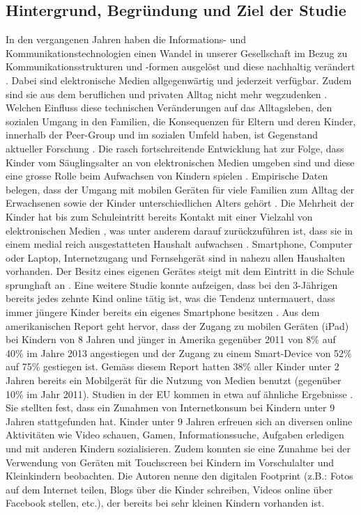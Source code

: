 \subsection{Hintergrund, Begründung und Ziel der Studie} \label{sec:Hintergrund}
In den vergangenen Jahren haben die Informations- und Kommunikationstechnologien einen Wandel in unserer Gesellschaft im Bezug zu Kommunikationsstrukturen und -formen ausgelöst und diese nachhaltig verändert \cite{Hasebrink2009, Bms2013}. Dabei sind elektronische Medien allgegenwärtig und jederzeit verfügbar. Zudem sind sie aus dem beruflichen und privaten Alltag nicht mehr wegzudenken \cite{Bmfsfj2013}. Welchen Einfluss diese technischen Veränderungen auf das Alltagsleben, den sozialen Umgang in den Familien, die Konsequenzen für Eltern und deren Kinder, innerhalb der Peer-Group und im sozialen Umfeld haben, ist Gegenstand aktueller Forschung \cite{Olafsson2014}. Die rasch fortschreitende Entwicklung hat zur Folge, dass Kinder vom Säuglingsalter an von elektronischen Medien umgeben sind und diese eine grosse Rolle beim Aufwachsen von Kindern spielen \cite{Feierabend2015, Divsi2015}. Empirische Daten belegen, dass der Umgang mit mobilen Geräten für viele Familien zum Alltag der Erwachsenen sowie der Kinder unterschiedlichen Alters gehört \cite{Wagner2016}. Die Mehrheit der Kinder hat bis zum Schuleintritt bereits Kontakt mit einer Vielzahl von elektronischen Medien \cite{Feierabend2015}, was unter anderem darauf zurückzuführen ist, dass sie in einem medial reich ausgestatteten Haushalt aufwachsen \cite{Suter2015}. Smartphone, Computer oder Laptop, Internetzugang und Fernsehgerät sind in nahezu allen Haushalten vorhanden. Der Besitz eines eigenen Gerätes steigt mit dem Eintritt in die Schule sprunghaft an \cite{Feierabend2015a}. Eine weitere Studie konnte aufzeigen, dass bei den 3-Jährigen bereits jedes zehnte Kind online tätig ist, was die Tendenz untermauert, dass immer jüngere Kinder bereits ein eigenes Smartphone besitzen \cite{Divsi2015}. Aus dem amerikanischen Report  geht hervor, dass der Zugang zu mobilen Geräten (iPad) bei Kindern von 8 Jahren und jünger in Amerika gegenüber 2011 von 8\% auf 40\% im Jahre 2013 angestiegen und der Zugang zu einem Smart-Device von 52\% auf 75\% gestiegen ist. Gemäss diesem Report hatten 38\% aller Kinder unter 2 Jahren bereits ein Mobilgerät für die Nutzung von Medien benutzt (gegenüber 10\% im Jahr 2011). Studien in der EU kommen in etwa auf ähnliche Ergebnisse \cite{Holloway2013}. Sie stellten fest, dass ein Zunahmen von Internetkonsum bei Kindern unter 9 Jahren stattgefunden hat. Kinder unter 9 Jahren erfreuen sich an diversen online Aktivitäten wie Video schauen, Gamen, Informationssuche, Aufgaben erledigen 
und mit anderen Kindern sozialisieren. Zudem konnten sie eine Zunahme bei der Verwendung von Geräten mit Touchscreen bei Kindern im Vorschulalter und Kleinkindern beobachten. Die Autoren nenne den digitalen Footprint (z.B.: Fotos auf dem Internet teilen, Blogs über die Kinder schreiben, Videos online über Facebook stellen, etc.), der bereits bei sehr kleinen Kindern vorhanden ist.

